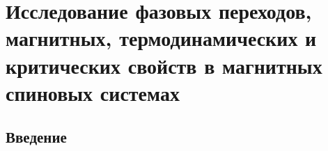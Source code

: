 \chapter{Исследование фазовых переходов, магнитных, термодинамических и критических свойств в магнитных спиновых системах}

% 


%
%
%

\section{Введение}

